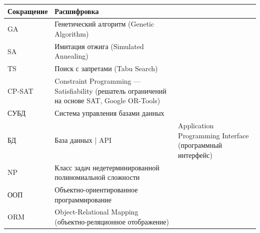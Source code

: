 \begin{longtable}{p{}p{}}
\toprule
Сокращение & Расшифровка \\
\midrule
GA & Генетический алгоритм (Genetic Algorithm) \\
SA & Имитация отжига (Simulated Annealing) \\
TS & Поиск с запретами (Tabu Search) \\
CP-SAT & Constraint Programming — Satisfiability (решатель ограничений на основе SAT, Google OR-Tools) \\
СУБД    & Система управления базами данных \\
БД      & База данных |
API     & Application Programming Interface (программный интерфейс) \\
NP      & Класс задач недетерминированной полиномиальной сложности \\
ООП     & Объектно-ориентированное программирование \\
ORM     & Object-Relational Mapping (объектно-реляционное отображение) \\
\bottomrule
\end{longtable}
